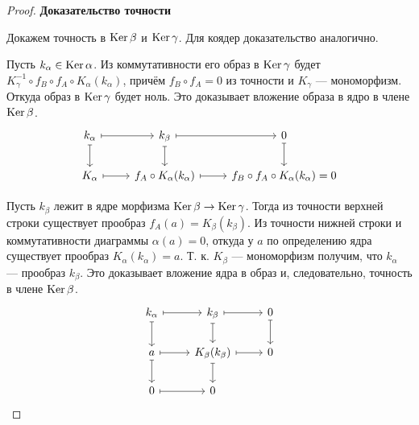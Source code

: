 \documentclass[../main.tex]{subfiles}
\begin{document}
\begin{proof}
    \textbf{Доказательство точности}

    Докажем точность в $\mathop{\mathrm{Ker}}\nolimits\beta$ и $\mathop{\mathrm{Ker}}\nolimits\gamma$. Для коядер доказательство аналогично.

    Пусть $k_\alpha \in \mathop{\mathrm{Ker}}\nolimits\alpha$. Из коммутативности его образ в $\mathop{\mathrm{Ker}}\nolimits\gamma$ будет $K_\gamma^{-1} \circ f_B\circ f_A\circ K_\alpha(k_\alpha)$, причём $f_B\circ f_A = 0$ из точности и $K_\gamma$ --- мономорфизм. Откуда образ в $\mathop{\mathrm{Ker}}\nolimits\gamma$ будет ноль. Это доказывает вложение образа в ядро в члене $\mathop{\mathrm{Ker}}\nolimits\beta$.
    \begin{equation*}
        \begin{tikzcd}
	{k_\alpha} & {k_\beta} & 0 \\
	{K_\alpha} & {f_A\circ K_\alpha(k_\alpha)} & {f_B\circ f_A\circ K_\alpha(k_\alpha)=0}
	\arrow[maps to, from=1-1, to=1-2]
	\arrow[maps to, from=2-1, to=2-2]
	\arrow[maps to, from=1-1, to=2-1]
	\arrow[maps to, from=1-2, to=1-3]
	\arrow[maps to, from=1-2, to=2-2]
	\arrow[maps to, from=2-2, to=2-3]
	\arrow[maps to, from=1-3, to=2-3]
\end{tikzcd}
    \end{equation*}

    Пусть $k_\beta$ лежит в ядре морфизма $\mathop{\mathrm{Ker}}\nolimits\beta\to\mathop{\mathrm{Ker}}\nolimits\gamma$. Тогда из точности верхней строки существует прообраз $f_A(a) = K_\beta(k_\beta)$. Из точности нижней строки и коммутативности диаграммы $\alpha(a) = 0$, откуда у $a$ по определению ядра существует прообраз $K_\alpha(k_\alpha) = a$. Т. к. $K_\beta$ --- мономорфизм получим, что $k_\alpha$ --- прообраз $k_\beta$. Это доказывает вложение ядра в образ и, следовательно, точность в члене $\mathop{\mathrm{Ker}}\nolimits\beta$.
    \begin{equation*}
        \begin{tikzcd}
	{k_\alpha} & {k_\beta} & 0 \\
	a & {K_\beta(k_\beta)} & 0 \\
	0 & 0
	\arrow[maps to, from=1-2, to=1-3]
	\arrow[maps to, from=1-2, to=2-2]
	\arrow[maps to, from=2-2, to=3-2]
	\arrow[maps to, from=1-3, to=2-3]
	\arrow[maps to, from=2-2, to=2-3]
	\arrow[maps to, from=2-1, to=2-2]
	\arrow[maps to, from=3-1, to=3-2]
	\arrow[maps to, from=2-1, to=3-1]
	\arrow[maps to, from=1-1, to=2-1]
	\arrow[maps to, from=1-1, to=1-2]
\end{tikzcd}
    \end{equation*}


\end{proof}
\end{document}
